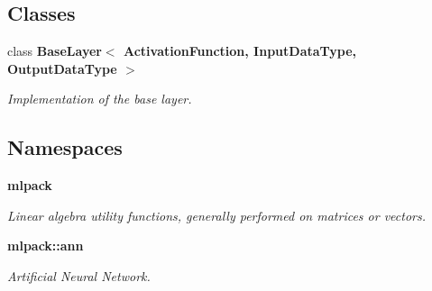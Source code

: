 \subsection*{Classes}
\begin{DoxyCompactItemize}
\item 
class \textbf{ Base\+Layer$<$ Activation\+Function, Input\+Data\+Type, Output\+Data\+Type $>$}
\begin{DoxyCompactList}\small\item\em Implementation of the base layer. \end{DoxyCompactList}\end{DoxyCompactItemize}
\subsection*{Namespaces}
\begin{DoxyCompactItemize}
\item 
 \textbf{ mlpack}
\begin{DoxyCompactList}\small\item\em Linear algebra utility functions, generally performed on matrices or vectors. \end{DoxyCompactList}\item 
 \textbf{ mlpack\+::ann}
\begin{DoxyCompactList}\small\item\em Artificial Neural Network. \end{DoxyCompactList}\end{DoxyCompactItemize}
